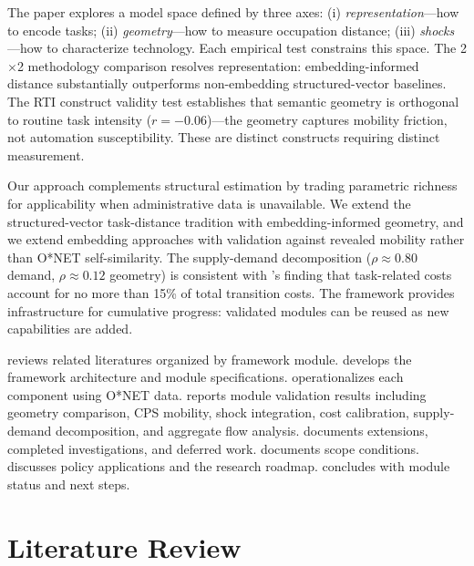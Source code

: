 \documentclass[12pt]{article}
\begin{document}
The paper explores a model space defined by three axes: (i) \emph{representation}---how to encode tasks; (ii) \emph{geometry}---how to measure occupation distance; (iii) \emph{shocks}---how to characterize technology. Each empirical test constrains this space. The 2$\times$2 methodology comparison resolves representation: embedding-informed distance substantially outperforms non-embedding structured-vector baselines. The RTI construct validity test establishes that semantic geometry is orthogonal to routine task intensity ($r = -0.06$)---the geometry captures mobility friction, not automation susceptibility. These are distinct constructs requiring distinct measurement.


Our approach complements structural estimation \citep{Traiberman2019} by trading parametric richness for applicability when administrative data is unavailable. We extend the structured-vector task-distance tradition \citep{GathmannSchonberg2010,CortesGallipoli2018,MouwEtAl2024,SchuStanTaska2024} with embedding-informed geometry, and we extend embedding approaches \citep{ZhangEtAl2021,DecorteEtAl2022} with validation against revealed mobility rather than O*NET self-similarity. The supply-demand decomposition ($\rho \approx 0.80$ demand, $\rho \approx 0.12$ geometry) is consistent with \citet{CortesGallipoli2018}'s finding that task-related costs account for no more than 15\% of total transition costs. The framework provides infrastructure for cumulative progress: validated modules can be reused as new capabilities are added.


 reviews related literatures organized by framework module.  develops the framework architecture and module specifications.  operationalizes each component using O*NET data.  reports module validation results including geometry comparison, CPS mobility, shock integration, cost calibration, supply-demand decomposition, and aggregate flow analysis.  documents extensions, completed investigations, and deferred work.  documents scope conditions.  discusses policy applications and the research roadmap.  concludes with module status and next steps.


\section{Literature Review}
\label{sec:literature}
\end{document}
